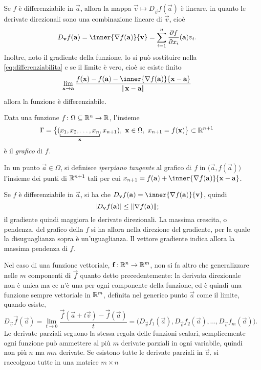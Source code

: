 Se $f$ è differenziabile in $\vec a$, allora la mappa $\vec v\mapsto D_{\vec v}f(\vec a)$ è lineare, in quanto le derivate direzionali sono una combinazione lineare di $\vec v$, cioè
\[
D_{\vec v}f(\vec a)=\inner{\grad f(\vec a)}{\vec v}=\sum_{i=1}^n\drp{f}{x_i}(\vec a)v_i.
\]
Inoltre, noto il gradiente della funzione, lo si può sostituire nella \eqref{eq:differenziabilita} e se il limite è vero, cioè se esiste finito
\[
\lim_{\vec x\to\vec a}\frac{f(\vec x)-f(\vec a)-\inner{\grad f(\vec a)}{\vec x-\vec a}}{\norm{\vec x-\vec a}}
\]
allora la funzione è differenziabile.

\begin{definizione} \label{d:grafico-iperpiano}
Data una funzione $f\colon\Omega\subseteq\mathbb{R}^n\to\mathbb{R}$, l'insieme
\[
\Gamma=\big\{(\underbracket[.5pt]{x_1,x_2,\dots,x_n}_{\vec x},x_{n+1}),\ \vec x\in\Omega,\ x_{n+1}=f(\vec x)\big\}\subset\R^{n+1}
\]
è il \emph{grafico} di $f$.

In un punto $\vec a\in\Omega$, si definisce \emph{iperpiano tangente} al grafico di $f$ in $\big(\vec a,f(\vec a)\big)$ l'insieme dei punti di $\mathbb{R}^{n+1}$ tali per cui $x_{n+1}=f(\vec a)+\inner{\grad f(\vec a)}{\vec x-\vec a}$.
\end{definizione}
\begin{osservazione}
Se $f$ è differenziabile in $\vec a$, si ha che $D_{\vec v}f(\vec a)=\inner{\grad f(\vec a)}{\vec v}$, quindi
\[
\lvert D_{\mathbf{v}}f(\mathbf{a})\rvert\leq\lVert\nabla f(\mathbf{a})\rVert;
\]
il gradiente quindi maggiora le derivate direzionali. La massima crescita, o pendenza, del grafico della $f$ si ha allora nella direzione del gradiente, per la quale la disuguaglianza sopra è un'uguaglianza. Il vettore gradiente indica allora la massima pendenza di $f$.
\end{osservazione}
Nel caso di una funzione vettoriale, $\mathbf{f}\colon\mathbb{R}^n\to\mathbb{R}^m$, non si fa altro che generalizzare nelle $m$ componenti di $\vec f$ quanto detto precedentemente: la derivata direzionale non è unica ma ce n'è una per ogni componente della funzione, ed è quindi una funzione sempre vettoriale in $\mathbb{R}^m$, definita nel generico punto $\vec a$ come il limite, quando esiste,
\[
D_{\vec v}\vec f(\vec a)=\lim_{t\to 0}\frac{\vec f(\vec a+t\vec v)-\vec f(\vec a)}{t}=\big(D_{\vec v}f_1(\vec a),D_{\vec v}f_2(\vec a),\dots,D_{\vec v}f_m(\vec a)\big).
\]
Le derivate parziali seguono la stessa regola delle funzioni scalari, semplicemente ogni funzione può ammettere al più $m$ derivate parziali in ogni variabile, quindi non più $n$ ma $mn$ derivate.
Se esistono tutte le derivate parziali in $\vec a$, si raccolgono tutte in una matrice $m\times n$

